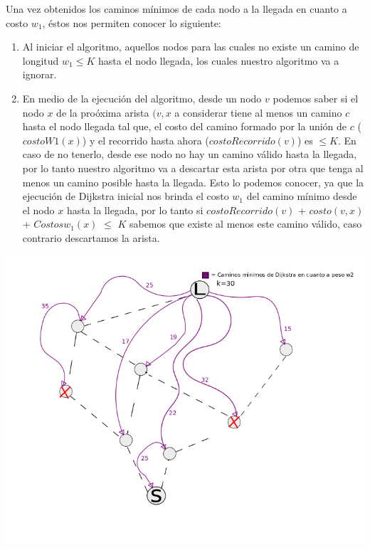\vspace{2mm}

Una vez obtenidos los caminos m\'inimos de cada nodo a la llegada en cuanto a costo $w_1$, \'estos nos permiten conocer lo siguiente:

\begin{enumerate}
\item Al iniciar el algoritmo, aquellos nodos para las cuales no existe un camino de longitud $w_1 \leq K$ hasta el nodo llegada, los cuales nuestro algoritmo va a ignorar.
\item En medio de la ejecuci\'on del algoritmo, desde un nodo $v$ podemos saber si el nodo $x$ de la pro\'oxima arista $(v,x$ a considerar tiene al menos un camino $c$ hasta el nodo llegada tal que, el costo del camino formado por la uni\'on de $c$ ($costoW1(x)$) y el recorrido hasta ahora ($costoRecorrido(v)$) es $\leq K$. En caso de no tenerlo, desde ese nodo no hay un camino v\'alido hasta la llegada, por lo tanto nuestro algoritmo va a descartar esta arista por otra que tenga al menos un camino posible hasta la llegada. Esto lo podemos conocer, ya que la ejecuci\'on de Dijkstra inicial nos brinda el costo $w_1$ del camino m\'inimo desde el nodo $x$ hasta la llegada, por lo tanto  si $costoRecorrido(v)$ + $costo(v,x)$ + $Costosw_1(x)$ $\leq$ $K$ sabemos que existe al menos este camino v\'alido, caso contrario descartamos la arista.
\end{enumerate}

\begin{center}
\includegraphics[scale=0.58]{img/inicializacion.png}
\end{center}	
\vspace{2mm}


